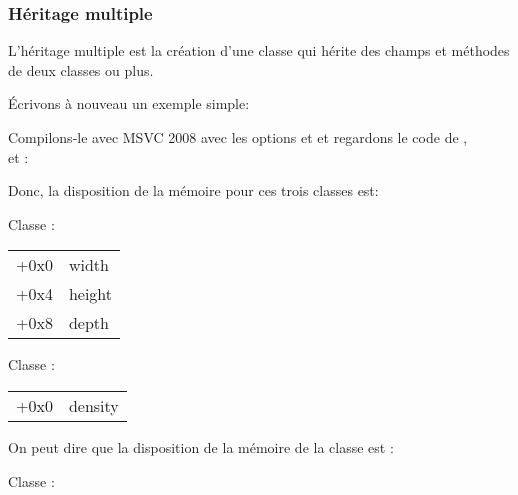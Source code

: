 \subsubsection{Héritage multiple}


L'héritage multiple est la création d'une classe qui hérite des champs et méthodes
de deux classes ou plus.

Écrivons à nouveau un exemple simple:




Compilons-le avec MSVC 2008 avec les options \Ox et \Obzero et regardons le code de ,\\
 et :








Donc, la disposition de la mémoire pour ces trois classes est:

Classe :

\begin{center}
\begin{tabular}{ | l | l | }
\hline
  \tableheader{} \\
\hline
  +0x0 & width \\
\hline
  +0x4 & height \\
\hline
  +0x8 & depth \\
\hline
\end{tabular}
\end{center}

Classe :

\begin{center}
\begin{tabular}{ | l | l | }
\hline
  \tableheader{} \\
\hline
  +0x0 & density \\
\hline
\end{tabular}
\end{center}


On peut dire que la disposition de la mémoire de la classe  est :

Classe :

